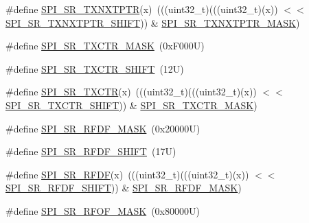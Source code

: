 \begin{DoxyCompactItemize}
\item 
\#define \mbox{\hyperlink{group___s_p_i___register___masks_gabc6d25e4bdcb3abacedb397ad24b0bc3}{S\+P\+I\+\_\+\+S\+R\+\_\+\+T\+X\+N\+X\+T\+P\+TR}}(x)~(((uint32\+\_\+t)(((uint32\+\_\+t)(x)) $<$$<$ \mbox{\hyperlink{group___s_p_i___register___masks_ga129ad514464ae667c6d78ee9840236d5}{S\+P\+I\+\_\+\+S\+R\+\_\+\+T\+X\+N\+X\+T\+P\+T\+R\+\_\+\+S\+H\+I\+FT}})) \& \mbox{\hyperlink{group___s_p_i___register___masks_ga5526eeae29bb85218c41d8a06608acbd}{S\+P\+I\+\_\+\+S\+R\+\_\+\+T\+X\+N\+X\+T\+P\+T\+R\+\_\+\+M\+A\+SK}})
\item 
\#define \mbox{\hyperlink{group___s_p_i___register___masks_gaba58e43f829f6e6103933bf570e9feb7}{S\+P\+I\+\_\+\+S\+R\+\_\+\+T\+X\+C\+T\+R\+\_\+\+M\+A\+SK}}~(0x\+F000\+U)
\item 
\#define \mbox{\hyperlink{group___s_p_i___register___masks_gad7fc9ecdd51f12aabb492271648e133b}{S\+P\+I\+\_\+\+S\+R\+\_\+\+T\+X\+C\+T\+R\+\_\+\+S\+H\+I\+FT}}~(12\+U)
\item 
\#define \mbox{\hyperlink{group___s_p_i___register___masks_gad5bd8906225c5b7e8ed97cacd8a0d3bd}{S\+P\+I\+\_\+\+S\+R\+\_\+\+T\+X\+C\+TR}}(x)~(((uint32\+\_\+t)(((uint32\+\_\+t)(x)) $<$$<$ \mbox{\hyperlink{group___s_p_i___register___masks_gad7fc9ecdd51f12aabb492271648e133b}{S\+P\+I\+\_\+\+S\+R\+\_\+\+T\+X\+C\+T\+R\+\_\+\+S\+H\+I\+FT}})) \& \mbox{\hyperlink{group___s_p_i___register___masks_gaba58e43f829f6e6103933bf570e9feb7}{S\+P\+I\+\_\+\+S\+R\+\_\+\+T\+X\+C\+T\+R\+\_\+\+M\+A\+SK}})
\item 
\#define \mbox{\hyperlink{group___s_p_i___register___masks_ga71c5bf00b7a6fdd6df9f46068d43cc90}{S\+P\+I\+\_\+\+S\+R\+\_\+\+R\+F\+D\+F\+\_\+\+M\+A\+SK}}~(0x20000\+U)
\item 
\#define \mbox{\hyperlink{group___s_p_i___register___masks_gab969720c704e5da43908b804881bd512}{S\+P\+I\+\_\+\+S\+R\+\_\+\+R\+F\+D\+F\+\_\+\+S\+H\+I\+FT}}~(17\+U)
\item 
\#define \mbox{\hyperlink{group___s_p_i___register___masks_ga6b4decf126f2648e8892c9c8341d2402}{S\+P\+I\+\_\+\+S\+R\+\_\+\+R\+F\+DF}}(x)~(((uint32\+\_\+t)(((uint32\+\_\+t)(x)) $<$$<$ \mbox{\hyperlink{group___s_p_i___register___masks_gab969720c704e5da43908b804881bd512}{S\+P\+I\+\_\+\+S\+R\+\_\+\+R\+F\+D\+F\+\_\+\+S\+H\+I\+FT}})) \& \mbox{\hyperlink{group___s_p_i___register___masks_ga71c5bf00b7a6fdd6df9f46068d43cc90}{S\+P\+I\+\_\+\+S\+R\+\_\+\+R\+F\+D\+F\+\_\+\+M\+A\+SK}})
\item 
\#define \mbox{\hyperlink{group___s_p_i___register___masks_gaec13b65c44bed521e4800ecd6f7e838a}{S\+P\+I\+\_\+\+S\+R\+\_\+\+R\+F\+O\+F\+\_\+\+M\+A\+SK}}~(0x80000\+U)
$$
\end{DoxyCompactItemize}
